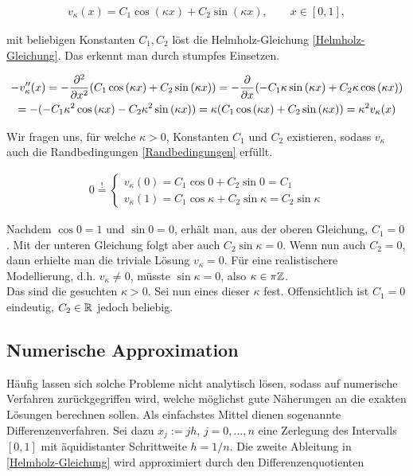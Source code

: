 \begin{align}
  v_\kappa(x) = C_1 \cos{(\kappa x)} + C_2 \sin{(\kappa x)}, \qquad
  x \in [0, 1],
  \label{Analytische_Lösung}
\end{align}

mit beliebigen Konstanten $C_1, C_2$ löst die Helmholz-Gleichung \eqref{Helmholz-Gleichung}. Das erkennt man durch stumpfes Einsetzen.

\begin{multline*}
  - v_\kappa^{\prime \prime}(x)
  = - \frac{\partial^2}{\partial x^2}
    (C_1 \cos{(\kappa x)} + C_2 \sin{(\kappa x)})
  = - \frac{\partial}{\partial x}
    (- C_1 \kappa \sin{(\kappa x)} + C_2 \kappa \cos{(\kappa x)}) \\
  = - (- C_1 \kappa^2 \cos{(\kappa x)} - C_2 \kappa^2 \sin{(\kappa x)})
  = \kappa (C_1 \cos{(\kappa x)} + C_2 \sin{(\kappa x)})
  = \kappa^2 v_\kappa(x)
\end{multline*}

Wir fragen uns, für welche $\kappa > 0$, Konstanten $C_1$ und $C_2$ existieren, sodass $v_\kappa$ auch die Randbedingungen \eqref{Randbedingungen} erfüllt.

\begin{align*}
  0 \stackrel{!}{=}
  \begin{cases}
    v_\kappa(0)
    = C_1 \cos{0} + C_2 \sin{0}
    = C_1 \\
    v_\kappa(1)
    = C_1 \cos{\kappa} + C_2 \sin{\kappa}
    = C_2 \sin{\kappa}
  \end{cases}
\end{align*}

Nachdem $\cos{0} = 1$ und $\sin{0} = 0$, erhält man, aus der oberen Gleichung, $C_1 = 0$. Mit der unteren Gleichung folgt aber auch $C_2 \sin{\kappa} = 0$. Wenn nun auch $C_2 = 0$, dann erhielte man die triviale Lösung $v_\kappa = 0$. Für eine realistischere Modellierung, d.h. $v_\kappa \neq 0$, müsste $\sin{\kappa} = 0$, also $\kappa \in \pi \mathbb{Z}$. \\

Das sind die gesuchten $\kappa > 0$. Sei nun eines dieser $\kappa$ fest. Offensichtlich ist $C_1 = 0$ eindeutig, $C_2 \in \mathbb{R}$ jedoch beliebig.

\subsection{Numerische Approximation}

Häufig lassen sich solche Probleme nicht analytisch lösen, sodass auf numerische Verfahren zurückgegriffen wird, welche möglichst gute Näherungen an die exakten Lösungen berechnen sollen. Als einfachstes Mittel dienen sogenannte Differenzenverfahren. Sei dazu $x_j := jh$, $j = 0, \ldots, n$ eine Zerlegung des Intervalls $[0, 1]$ mit äquidistanter Schrittweite $h = 1/n$. Die zweite Ableitung in \eqref{Helmholz-Gleichung} wird approximiert durch den Differenzenquotienten

